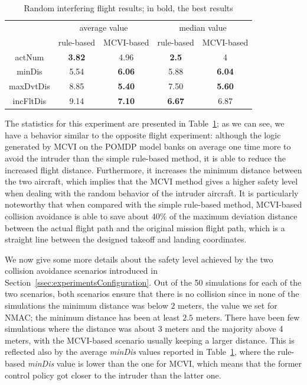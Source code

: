 \documentclass{article}
\begin{document}
\begin{table}[t]
	\caption{Random interfering flight results; in bold, the best results}
	\label{tab:randomInterferingFlightAverageResults}
	\centering
	\begin{tabular}{c|cc|cc}
	& \multicolumn{2}{c|}{average value} & \multicolumn{2}{c}{median value}\\
	& rule-based & MCVI-based & rule-based & MCVI-based\\
	\hline
	actNum & \textbf{3.82} & 4.96 & \textbf{2.5} & 4 \\
	minDis & 5.54 & \textbf{6.06} & 5.88 & \textbf{6.04} \\
	maxDvtDis & 8.85 & \textbf{5.40} & 7.50 & \textbf{5.60} \\
	incFltDis & 9.14 & \textbf{7.10} & \textbf{6.67} & 6.87
	\end{tabular}
\end{table}
The statistics for this experiment are presented in Table~\ref{tab:randomInterferingFlightAverageResults};
as we can see, we have a behavior similar to the opposite flight experiment: 
although the logic generated by MCVI on the POMDP model banks on average one time more to avoid the intruder than the simple rule-based method, it is able to reduce the increased flight distance.
Furthermore, it increases the minimum distance between the two aircraft, which implies that the MCVI method gives a higher safety level when dealing with the random behavior of the intruder aircraft.
It is particularly noteworthy that when compared with the simple rule-based method, MCVI-based collision avoidance is able to save about $40\%$ of the maximum deviation distance between the actual flight path and the original mission flight path, which is a straight line between the designed takeoff and landing coordinates. 

We now give some more details about the safety level achieved by the two collision avoidance scenarios introduced in Section~\ref{ssec:experimentsConfiguration}.
Out of the 50 simulations for each of the two scenarios, 
both scenarios ensure that there is no collision since in none of the simulations the minimum distance was below $2$ meters, the value we set for NMAC;
the minimum distance has been at least $2.5$ meters.
There have been few simulations where the distance was about 3 meters and the majority above 4 meters, with the MCVI-based scenario usually keeping a larger distance.
This is reflected also by the average \emph{minDis} values reported in Table~\ref{tab:randomInterferingFlightAverageResults}, where the rule-based \emph{minDis} value is lower than the one for MCVI, which means that the former control policy got closer to the intruder than the latter one.
\end{document}
